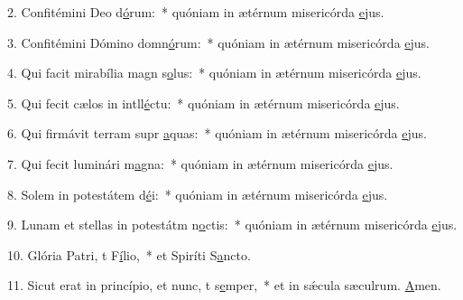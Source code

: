 2. Confitémini Deo d\uline{ó}rum:~* quóniam in ætérnum misericórda \uline{e}jus.\par 
3. Confitémini Dómino domn\uline{ó}rum:~* quóniam in ætérnum misericórda \uline{e}jus.\par 
4. Qui facit mirabília magn s\uline{o}lus:~* quóniam in ætérnum misericórda \uline{e}jus.\par 
5. Qui fecit cælos in intll\uline{é}ctu:~* quóniam in ætérnum misericórda \uline{e}jus.\par 
6. Qui firmávit terram supr \uline{a}quas:~* quóniam in ætérnum misericórda \uline{e}jus.\par 
7. Qui fecit luminári m\uline{a}gna:~* quóniam in ætérnum misericórda \uline{e}jus.\par 
8. Solem in potestátem d\uline{é}i:~* quóniam in ætérnum misericórda \uline{e}jus.\par 
9. Lunam et stellas in potestátm n\uline{o}ctis:~* quóniam in ætérnum misericórda \uline{e}jus.\par 
10. Glória Patri, t F\uline{í}lio,~* et Spiríti S\uline{a}ncto.\par 
11. Sicut erat in princípio, et nunc, t s\uline{e}mper,~* et in sǽcula sæculrum. \uline{A}men.\par 
